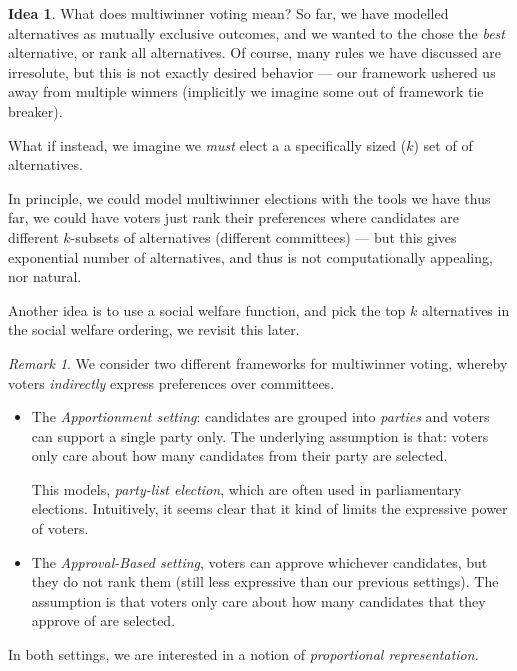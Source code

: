 \documentclass{book}
\theoremstyle{plain}
\theoremstyle{definition}
\newtheorem{idea}[theorem]{Idea}
\theoremstyle{remark}
\newtheorem{remark}[theorem]{Remark}
\begin{document}
\begin{idea}
    What does multiwinner voting mean? So far, 
    we have modelled alternatives as mutually exclusive outcomes, and we 
    wanted to the chose the \emph{best} alternative, or rank all alternatives.
    Of course, many rules we have discussed are irresolute, but this 
    is not exactly desired behavior --- our framework ushered us away from 
    multiple winners (implicitly we imagine some out of framework tie breaker).
    
    What if instead, we imagine we \emph{must} elect a
    a specifically sized ($k$) set of of alternatives.

    In principle, we could model multiwinner elections with the tools we have thus far, 
    we could have voters just rank their preferences where candidates are different 
    $k$-subsets of alternatives (different committees) --- but this gives 
    exponential number of alternatives, and thus is not computationally appealing, nor natural.

    Another idea is to use a 
    social welfare function, and pick the 
    top $k$ alternatives in the social welfare ordering, 
    we revisit this later.
\end{idea}


\begin{remark}
    We consider two 
    different frameworks for 
    multiwinner voting,
    whereby voters \emph{indirectly}
    express preferences over committees.

    \begin{itemize}
        \item The \emph{Apportionment setting}:
        candidates are grouped into 
        \emph{parties} and voters can support a single party only.
        The underlying assumption is that:
        voters only care about how many 
        candidates from their party are selected.

        This models, \emph{party-list election}, which are often used in 
        parliamentary elections.
        Intuitively, it seems clear that it kind of limits the 
        expressive power of voters.


        \item The \emph{Approval-Based setting}, voters 
        can approve whichever candidates, but
        they do not rank them (still less expressive than our 
        previous settings).
        The assumption is that voters only care about how many candidates
        that they approve of are selected.
    \end{itemize}

    In both settings, we are interested in a 
    notion of \emph{proportional representation}.
\end{remark}
\end{document}
